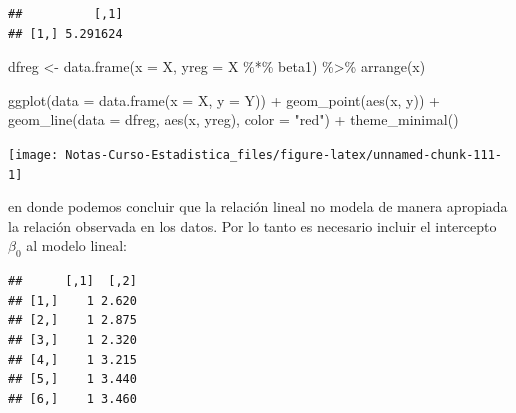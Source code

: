 \documentclass[
  12pt,
]{book}
\newenvironment{Shaded}{\begin{snugshade}}{\end{snugshade}}
\newcommand{\AttributeTok}[1]{\textcolor[rgb]{0.77,0.63,0.00}{#1}}
\newcommand{\DecValTok}[1]{\textcolor[rgb]{0.00,0.00,0.81}{#1}}
\newcommand{\FunctionTok}[1]{\textcolor[rgb]{0.00,0.00,0.00}{#1}}
\newcommand{\NormalTok}[1]{#1}
\newcommand{\OtherTok}[1]{\textcolor[rgb]{0.56,0.35,0.01}{#1}}
\newcommand{\SpecialCharTok}[1]{\textcolor[rgb]{0.00,0.00,0.00}{#1}}
\newcommand{\StringTok}[1]{\textcolor[rgb]{0.31,0.60,0.02}{#1}}
\begin{document}
\begin{verbatim}
##          [,1]
## [1,] 5.291624
\end{verbatim}

\begin{Shaded}
\begin{Highlighting}[]
\NormalTok{dfreg }\OtherTok{\textless{}{-}} \FunctionTok{data.frame}\NormalTok{(}\AttributeTok{x =}\NormalTok{ X, }\AttributeTok{yreg =}\NormalTok{ X }\SpecialCharTok{\%*\%}\NormalTok{ beta1) }\SpecialCharTok{\%\textgreater{}\%}
    \FunctionTok{arrange}\NormalTok{(x)}
\end{Highlighting}
\end{Shaded}

\begin{Shaded}
\begin{Highlighting}[]
\FunctionTok{ggplot}\NormalTok{(}\AttributeTok{data =} \FunctionTok{data.frame}\NormalTok{(}\AttributeTok{x =}\NormalTok{ X, }\AttributeTok{y =}\NormalTok{ Y)) }\SpecialCharTok{+} \FunctionTok{geom\_point}\NormalTok{(}\FunctionTok{aes}\NormalTok{(x,}
\NormalTok{    y)) }\SpecialCharTok{+} \FunctionTok{geom\_line}\NormalTok{(}\AttributeTok{data =}\NormalTok{ dfreg, }\FunctionTok{aes}\NormalTok{(x, yreg), }\AttributeTok{color =} \StringTok{"red"}\NormalTok{) }\SpecialCharTok{+}
    \FunctionTok{theme\_minimal}\NormalTok{()}
\end{Highlighting}
\end{Shaded}

\begin{center}\texttt{[image: Notas-Curso-Estadistica\_files/figure-latex/unnamed-chunk-111-1]} \end{center}

en donde podemos concluir que la relación lineal no modela de manera
apropiada la relación observada en los datos. Por lo tanto es necesario
incluir el intercepto \(\beta_0\) al modelo lineal:

\begin{Shaded}
\end{Shaded}

\begin{verbatim}
##      [,1]  [,2]
## [1,]    1 2.620
## [2,]    1 2.875
## [3,]    1 2.320
## [4,]    1 3.215
## [5,]    1 3.440
## [6,]    1 3.460
\end{verbatim}
\end{document}
